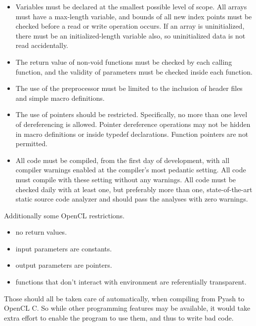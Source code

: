 \begin{multicols}{2}
\begin{itemize}
\item Variables must be declared at the smallest possible level of scope. All
arrays must have a max-length variable, and bounds of all new index points must
be checked before a read or write operation occurs.  If an array is
uninitialized, there must be an initialized-length variable also, so
uninitialized data is not read accidentally. 
\item The return value of non-void functions must be checked by each calling 
function, and the validity of parameters must be checked inside each function. 
\item The use of the preprocessor must be limited to the inclusion of header files and 
simple macro definitions.  
\item The use of pointers should be restricted. Specifically, no more than one
level of dereferencing is allowed. Pointer dereference operations may not be
hidden in macro definitions or inside typedef declarations. Function pointers
are not permitted.
\item All code must be compiled, from the first day of development, with all
compiler warnings enabled at the compiler’s most pedantic setting. All code must
compile with these setting without any warnings. All code must be checked daily
with at least one, but preferably more than one, state-of-the-art static source
code analyzer and should pass the analyses with zero warnings.  
\end{itemize}

Additionally some OpenCL restrictions.
\begin{itemize}
\item no return values.
\item input parameters are constants.
\item output parameters are pointers. 
\item functions that don't interact with environment are referentially
        transparent.
\end{itemize}

Those should all be taken care of automatically, when compiling from Pyash to
OpenCL C.
So while other programming features may be available, it would take extra effort
to enable the program to use them, and thus to write bad code. 
\end{multicols}
